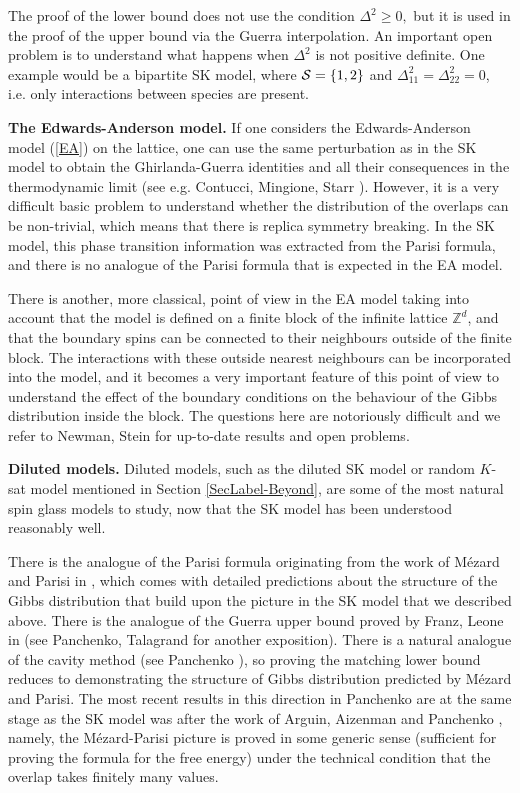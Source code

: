 \documentclass[12pt]{article}
\newcommand{\spe}{{\cal S}}
\theoremstyle{nonumberplain}
\begin{document}
The proof of the lower bound does not use the condition $\Delta^2\geq 0,$ but it is used in the proof of the upper bound via the Guerra interpolation. An important open problem is to understand what happens when $\Delta^2$ is not positive definite. One example would be a bipartite SK model, where $\spe = \{1,2\}$ and $\Delta_{11}^2 = \Delta_{22}^2 = 0$, i.e. only interactions between species are present.
 

\medskip
\noindent
\textbf{The Edwards-Anderson model.} If one considers the Edwards-Anderson model (\ref{EA}) on the lattice, one can use the same perturbation as in the SK model to obtain the Ghirlanda-Guerra identities and all their consequences in the thermodynamic limit (see e.g. Contucci, Mingione, Starr \cite{CEA}). However, it is a very difficult basic problem to understand whether the distribution of the overlaps can be non-trivial, which means that there is replica symmetry breaking. In the SK model, this phase transition information  was extracted from the Parisi formula, and there is no analogue of the Parisi formula that is expected in the EA model.

There is another, more classical, point of view in the EA model taking into account that the model is defined on a finite block of the infinite lattice $\mathbb{Z}^d$, and that the boundary spins can be connected to their neighbours outside of the finite block. The interactions with these outside nearest neighbours can be incorporated into the model, and it becomes a very important feature of this point of view to understand the effect of the boundary conditions on the behaviour of the Gibbs distribution inside the block. The questions here are notoriously difficult and we refer to Newman, Stein \cite{NS} for up-to-date results and open problems.

\medskip
\noindent
\textbf{Diluted models.} Diluted models, such as the diluted SK model or random $K$-sat model mentioned in Section \ref{SecLabel-Beyond}, are some of the most natural spin glass models to study, now that the SK model has been understood reasonably well. 

There is the analogue of the Parisi formula originating from the work of M\'ezard and Parisi in \cite{Mezard}, which comes with detailed predictions about the structure of the Gibbs distribution that build upon the picture in the SK model that we described above. There is the analogue of the Guerra upper bound proved by Franz, Leone in \cite{FL} (see Panchenko, Talagrand \cite{PT} for another exposition). There is a natural analogue of the cavity method (see Panchenko \cite{Pspins}), so proving the matching lower bound reduces to demonstrating the structure of Gibbs distribution predicted by M\'ezard and Parisi. The most recent results in this direction in Panchenko \cite{finiteRSB} are at the same stage as the SK model was after the work of Arguin, Aizenman \cite{AA} and Panchenko \cite{PGG}, namely, the M\'ezard-Parisi picture is proved in some generic sense (sufficient for proving the formula for the free energy) under the technical condition that the overlap takes finitely many values. 
\end{document}
